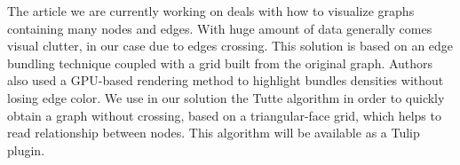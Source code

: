 The article we are currently working on deals with how to visualize graphs containing many nodes and edges. With huge amount of data generally comes visual clutter, in our case due to edges crossing. This solution is based on an edge bundling technique coupled with a grid built from the original graph. Authors also used a GPU-based rendering method to highlight bundles densities without losing edge color. We use in our solution the Tutte algorithm in order to quickly obtain a graph without crossing, based on a triangular-face grid, which helps to read relationship between nodes. This algorithm will be available as a Tulip plugin. 
